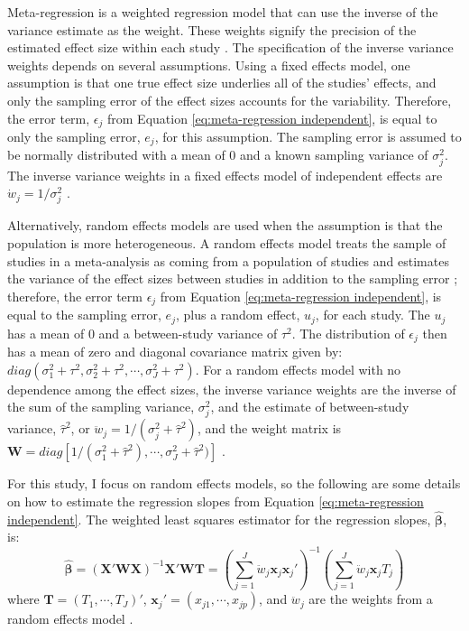 Meta-regression is a weighted regression model that can use the inverse of the variance estimate as the weight. These weights signify the precision of the estimated effect size within each study \autocite{viechtbauer2007}. The specification of the inverse variance weights depends on several assumptions. Using a fixed effects model, one assumption is that one true effect size underlies all of the studies' effects, and only the sampling error of the effect sizes accounts for the variability. Therefore, the error term, $\epsilon_j$ from Equation \ref{eq:meta-regression independent}, is equal to only the sampling error, $e_j$, for this assumption. The sampling error is assumed to be normally distributed with a mean of 0 and a known sampling variance of $\sigma^2_j$. The inverse variance weights in a fixed effects model of independent effects are $\dot{w}_j = 1/\sigma^2_j$ \autocite{cooper2019}. 

Alternatively, random effects models are used when the assumption is that the population is more heterogeneous. A random effects model treats the sample of studies in a meta-analysis as coming from a population of studies and estimates the variance of the effect sizes between studies in addition to the sampling error \autocite{higgins2009}; therefore, the error term $\epsilon_j$ from Equation \ref{eq:meta-regression independent}, is equal to the sampling error, $e_j$, plus a random effect, $u_j$, for each study. The $u_j$ has a mean of 0 and a between-study variance of $\tau^2$. The distribution of $\epsilon_j$ then has a mean of zero and diagonal covariance matrix given by: $diag(\sigma^2_1 + \tau^2, \sigma^2_2 + \tau^2, \cdots, \sigma^2_J + \tau^2)$. For a random effects model with no dependence among the effect sizes, the inverse variance weights are the inverse of the sum of the sampling variance, $\sigma^2_j$, and the estimate of between-study variance, $\hat{\tau}^2$, or $\ddot{w}_j = 1/(\sigma^2_j + \hat{\tau}^2)$, and the weight matrix is $\mathbf{W} = diag[1/(\sigma^2_1 + \hat{\tau}^2), \cdots, \sigma^2_J + \hat{\tau}^2)]$ \autocite{cooper2019}.

For this study, I focus on random effects models, so the following are some details on how to estimate the regression slopes from Equation \ref{eq:meta-regression independent}. The weighted least squares estimator for the regression slopes, $\bm{\hat{\beta}}$, is:
\begin{equation}\label{eq:estbetaind}
    \bm{\hat{\beta}} = (\mathbf{X}'\mathbf{W}\mathbf{X})^{-1}\mathbf{X}'\mathbf{W}\mathbf{T} = \left( \sum_{j=1}^J \ddot{w}_j\mathbf{x}_j\mathbf{x}_j' \right)^{-1}\left( \sum_{j=1}^J \ddot{w}_j\mathbf{x}_j T_j \right)
\end{equation}
where $\mathbf{T} = (T_1, \cdots, T_J)'$, $\mathbf{x}_j' = (x_{j1}, \cdots, x_{jp})$, and $\ddot{w}_j$ are the weights from a random effects model \autocite{cooper2019}. 

